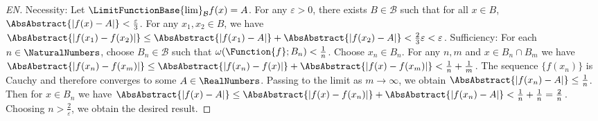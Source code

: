 \begin{proof}[EN]
Necessity: Let $\LimitFunctionBase{\lim}_{\mathcal{B}} f(x) = A$. For any $\varepsilon > 0$, there exists $B \in \mathcal{B}$ such that for all $x \in B$, $\AbsAbstract{\left| f(x) - A \right|} < \frac{\varepsilon}{3}$. For any $x_1, x_2 \in B$, we have $\AbsAbstract{\left| f(x_1) - f(x_2) \right|} \leq \AbsAbstract{\left| f(x_1) - A \right|} + \AbsAbstract{\left| f(x_2) - A \right|} < \frac{2}{3}\varepsilon < \varepsilon$.
Sufficiency: For each $n \in \NaturalNumbers$, choose $B_n \in \mathcal{B}$ such that $\omega(\Function{f}; B_n) < \frac{1}{n}$. Choose $x_n \in B_n$. For any $n, m$ and $x \in B_n \cap B_m$ we have $\AbsAbstract{\left| f(x_n) - f(x_m) \right|} \leq \AbsAbstract{\left| f(x_n) - f(x) \right|} + \AbsAbstract{\left| f(x) - f(x_m) \right|} < \frac{1}{n} + \frac{1}{m}$. The sequence $\{f(x_n)\}$ is Cauchy and therefore converges to some $A \in \RealNumbers$. Passing to the limit as $m \to \infty$, we obtain $\AbsAbstract{\left| f(x_n) - A \right|} \leq \frac{1}{n}$. Then for $x \in B_n$ we have $\AbsAbstract{\left| f(x) - A \right|} \leq \AbsAbstract{\left| f(x) - f(x_n) \right|} + \AbsAbstract{\left| f(x_n) - A \right|} < \frac{1}{n} + \frac{1}{n} = \frac{2}{n}$. Choosing $n > \frac{2}{\varepsilon}$, we obtain the desired result.
\end{proof}
